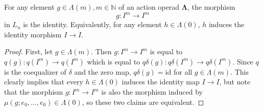 \documentclass{amsbook} %
\newcommand{\id}{\textrm{id}}
\newcommand{\ML}{\mathbf{\Lambda}}
\newcommand{\ELnn}{E\Lambda(\underline{2n})}
\numberwithin{section}{chapter}
\begin{document}
\begin{lem} \label{noscalar} For any element $g \in \Lambda(m), m \in \mathbb{N}$ of an action operad $\ML$, the morphism
\[
g: I^m \to I^m
\]
in $L_n$ is the identity.
Equivalently, for any element $h \in \Lambda(0)$, $h$ induces the identity morphism $I \to I$.
\end{lem}
\begin{proof}
First, let $g \in \Lambda(m)$. Then $g: I^m \to I^m$ is equal to $q(g):q(I^m) \to q(I^m)$ which is equal to $q\delta(g): q\delta(I^m) \to q\delta(I^m)$. Since $q$ is the coequalizer of $\delta$ and the zero map, $q\delta(g) = \id$ for all $g \in \Lambda(m)$. This clearly implies that every $h \in \Lambda(0)$ induces the identity map $I \to I$, but note that the morphism $g:I^m \to I^m$ is also the morphism induced by $\mu(g; e_0, \ldots, e_0) \in \Lambda(0)$, so these two claims are equivalent.


%
\end{proof}
\end{document}
